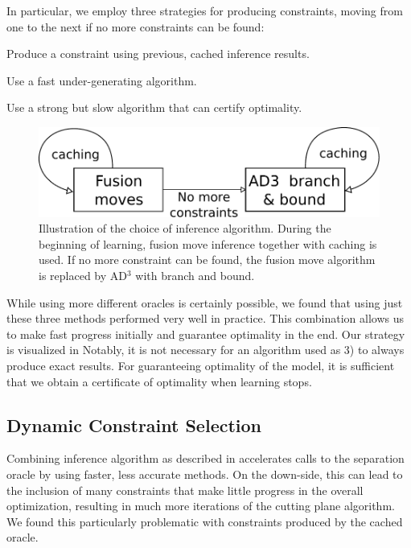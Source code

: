 In particular, we employ three strategies for producing constraints,
moving from one to the next if no more constraints can be found:
\begin{enumerate*}
    \item Produce a constraint using previous, cached inference results.
    \item Use a fast under-generating algorithm.
    \item Use a strong but slow algorithm that can certify optimality.
\end{enumerate*}

\begin{figure}
\centering
\includegraphics[width=\linewidth]{exact_learning/images/inference_algs}
\caption{%
Illustration of the choice of inference algorithm. During the beginning of learning,
fusion move inference together with caching is used. If no more constraint can be found,
the fusion move algorithm is replaced by AD$^3$ with branch and bound.
}
\end{figure}

While using more different oracles is certainly possible, we found
that using just these three methods performed very well in practice.  This
combination allows us to make fast progress initially and guarantee optimality
in the end. Our strategy is visualized in 
Notably, it is not necessary for an algorithm used as 3) to always produce
exact results. For guaranteeing optimality of the model, it is sufficient that
we obtain a certificate of optimality when learning stops.

\subsection{Dynamic Constraint Selection}
Combining inference algorithm as described in 
accelerates calls to the separation oracle by using faster, less accurate
methods. On the down-side, this can lead to the inclusion of many constraints
that make little progress in the overall optimization, resulting in much more
iterations of the cutting plane algorithm. We found this particularly problematic
with constraints produced by the cached oracle.

